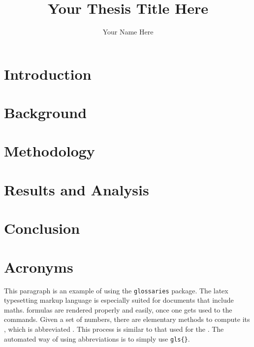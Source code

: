 \documentclass[]{../tex_resources/afitthesis}
\title{Your Thesis Title Here}
\author{Your Name Here}
\begin{document}
\maketitle %


\chapter{Introduction}


\chapter{Background}


\chapter{Methodology}


\chapter{Results and Analysis}


\chapter{Conclusion}


\appendix %

\chapter{Acronyms}

This paragraph is an example of using the \verb|glossaries| package. The
\Gls{latex} typesetting markup language is especially suited for documents that
include \gls{maths}. \Glspl{formula} are rendered properly and easily, once one
gets used to the commands. Given a set of numbers, there are elementary methods
to compute its , which is abbreviated . This process
is similar to that used for the . The automated way of using abbreviations is to simply use \verb|gls{}|.
\end{document}
